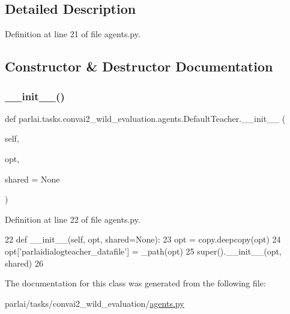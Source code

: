 \subsection{Detailed Description}


Definition at line 21 of file agents.\+py.



\subsection{Constructor \& Destructor Documentation}
\mbox{\label{classparlai_1_1tasks_1_1convai2__wild__evaluation_1_1agents_1_1DefaultTeacher_a0952cee2a6035fb39bfba3ad0c04b8c3}} 
\subsubsection{\texorpdfstring{\+\_\+\+\_\+init\+\_\+\+\_\+()}{\_\_init\_\_()}}
{\footnotesize\ttfamily def parlai.\+tasks.\+convai2\+\_\+wild\+\_\+evaluation.\+agents.\+Default\+Teacher.\+\_\+\+\_\+init\+\_\+\+\_\+ (\begin{DoxyParamCaption}\item[{}]{self,  }\item[{}]{opt,  }\item[{}]{shared = {\ttfamily None} }\end{DoxyParamCaption})}



Definition at line 22 of file agents.\+py.


\begin{DoxyCode}
22     \textcolor{keyword}{def }\_\_init\_\_(self, opt, shared=None):
23         opt = copy.deepcopy(opt)
24         opt[\textcolor{stringliteral}{'parlaidialogteacher\_datafile'}] = \_path(opt)
25         super().\_\_init\_\_(opt, shared)
26 \end{DoxyCode}


The documentation for this class was generated from the following file\+:\begin{DoxyCompactItemize}
\item 
parlai/tasks/convai2\+\_\+wild\+\_\+evaluation/\hyperlink{parlai_2tasks_2convai2__wild__evaluation_2agents_8py}{agents.\+py}\end{DoxyCompactItemize}
